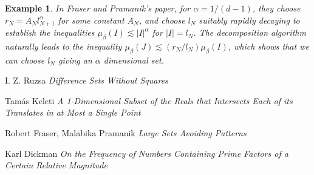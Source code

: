 \documentclass{report}
\theoremstyle{plain}
\newtheorem*{example}{Example}
\theoremstyle{plain}
\begin{document}
\begin{example}
    In Fraser and Pramanik's paper, for $\alpha = 1/(d-1)$, they choose $r_N = A_N l_{N+1}^\alpha$ for some constant $A_N$, and choose $l_N$ suitably rapidly decaying to establish the inequalities $\mu_\beta(I) \lesssim |I|^\alpha$ for $|I| = l_N$. The decomposition algorithm naturally leads to the inequality $\mu_\beta(J) \lesssim (r_N/l_N) \mu_\beta(I)$, which shows that we can choose $l_N$ giving an $\alpha$ dimensional set.
\end{example}

\begin{thebibliography}{9}

I. Z. Ruzsa
\textit{Difference Sets Without Squares}

Tam\'{a}s Keleti
\textit{A 1-Dimensional Subset of the Reals that Intersects Each of its Translates in at Most a Single Point}

Robert Fraser, Malabika Pramanik
\textit{Large Sets Avoiding Patterns}

Karl Dickman
\textit{On the Frequency of Numbers Containing Prime Factors of a Certain Relative Magnitude}

\end{thebibliography}
\end{document}
